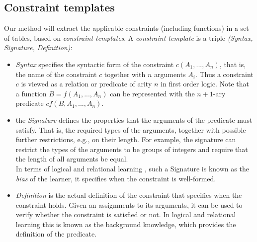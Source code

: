 \documentclass{sig-alternate-05-2015}
\newcommand{\format}[1]{\textit{#1}\xspace}
\newcommand{\template}{\format{constraint template}}
\newcommand{\CName}{Syntax\xspace}
\newcommand{\CSignature}{Signature\xspace}
\newcommand{\CFunction}{Definition\xspace}
\begin{document}
\subsection{Constraint templates}
Our method will extract the applicable constraints (including functions) in a set of tables, based on \textit{constraint templates}.
%
A \template is a triple \textit{(\CName, \CSignature, \CFunction)}:
\begin{itemize}
\item
\textit{\CName}  specifies the syntactic form of the constraint $c(A_1, ...,A_n)$, that is, the name of the constraint $c$ together
with $n$ arguments $A_i$. Thus a constraint $c$ is viewed as a relation or predicate of arity $n$ in first order logic. Note that a function $B=f(A_1,...,A_n)$ can be represented with the $n+1$-ary predicate $cf(B,A_1,...,A_n)$.

\item the \textit{\CSignature} defines the properties that the arguments of the predicate must satisfy. That is, the required types of the arguments, together
with possible further restrictions, e.g., on their length. For example, the signature can restrict the types of the arguments to be groups of integers and require that the length of all arguments be equal. \\
In terms of logical and relational learning \cite{luc_book}, such a \CSignature is known as the {\em bias} of the learner, it specifies when the constraint is well-formed.

\item \textit{\CFunction} is the actual definition of the constraint that specifies when the constraint holds. Given an assignments to its arguments, it can be used to verify whether the constraint is satisfied or not. %
In logical and relational learning this is known as the background knowledge, which provides the definition of the predicate.
\end{itemize}
\end{document}

